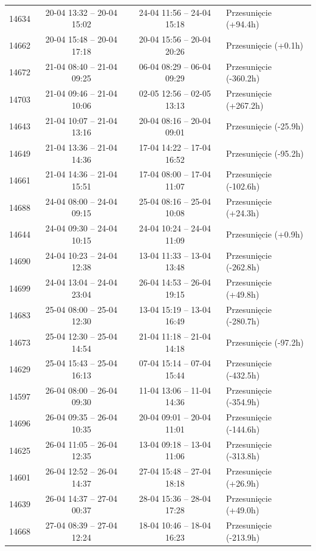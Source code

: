 \begin{table}[htbp]
\begin{tabular}{|r|c|c|l|}
14634 & 20-04 13:32 -- 20-04 15:02 & 24-04 11:56 -- 24-04 15:18 & Przesunięcie (+94.4h) \\ 
14662 & 20-04 15:48 -- 20-04 17:18 & 20-04 15:56 -- 20-04 20:26 & Przesunięcie (+0.1h) \\ 
14672 & 21-04 08:40 -- 21-04 09:25 & 06-04 08:29 -- 06-04 09:29 & Przesunięcie (-360.2h) \\ 
14703 & 21-04 09:46 -- 21-04 10:06 & 02-05 12:56 -- 02-05 13:13 & Przesunięcie (+267.2h) \\ 
14643 & 21-04 10:07 -- 21-04 13:16 & 20-04 08:16 -- 20-04 09:01 & Przesunięcie (-25.9h) \\ 
14649 & 21-04 13:36 -- 21-04 14:36 & 17-04 14:22 -- 17-04 16:52 & Przesunięcie (-95.2h) \\ 
14661 & 21-04 14:36 -- 21-04 15:51 & 17-04 08:00 -- 17-04 11:07 & Przesunięcie (-102.6h) \\ 
14688 & 24-04 08:00 -- 24-04 09:15 & 25-04 08:16 -- 25-04 10:08 & Przesunięcie (+24.3h) \\ 
14644 & 24-04 09:30 -- 24-04 10:15 & 24-04 10:24 -- 24-04 11:09 & Przesunięcie (+0.9h) \\ 
14690 & 24-04 10:23 -- 24-04 12:38 & 13-04 11:33 -- 13-04 13:48 & Przesunięcie (-262.8h) \\ 
14699 & 24-04 13:04 -- 24-04 23:04 & 26-04 14:53 -- 26-04 19:15 & Przesunięcie (+49.8h) \\ 
14683 & 25-04 08:00 -- 25-04 12:30 & 13-04 15:19 -- 13-04 16:49 & Przesunięcie (-280.7h) \\ 
14673 & 25-04 12:30 -- 25-04 14:54 & 21-04 11:18 -- 21-04 14:18 & Przesunięcie (-97.2h) \\ 
14629 & 25-04 15:43 -- 25-04 16:13 & 07-04 15:14 -- 07-04 15:44 & Przesunięcie (-432.5h) \\ 
14597 & 26-04 08:00 -- 26-04 09:30 & 11-04 13:06 -- 11-04 14:36 & Przesunięcie (-354.9h) \\ 
14696 & 26-04 09:35 -- 26-04 10:35 & 20-04 09:01 -- 20-04 11:01 & Przesunięcie (-144.6h) \\ 
14625 & 26-04 11:05 -- 26-04 12:35 & 13-04 09:18 -- 13-04 11:06 & Przesunięcie (-313.8h) \\ 
14601 & 26-04 12:52 -- 26-04 14:37 & 27-04 15:48 -- 27-04 18:18 & Przesunięcie (+26.9h) \\ 
14639 & 26-04 14:37 -- 27-04 00:37 & 28-04 15:36 -- 28-04 17:28 & Przesunięcie (+49.0h) \\ 
14668 & 27-04 08:39 -- 27-04 12:24 & 18-04 10:46 -- 18-04 16:23 & Przesunięcie (-213.9h) \\ 

\end{tabular}
\end{table}
